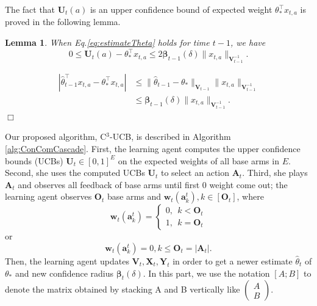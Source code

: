 \documentclass{article}
\newcommand{\bbeta}{\boldsymbol{\beta}}
\newcommand{\bA}{\mathbf{A}}
\newcommand{\ba}{\mathbf{a}}
\newcommand{\bO}{\mathbf{O}}
\newcommand{\bU}{\mathbf{U}}
\newcommand{\bV}{\mathbf{V}}
\newcommand{\bw}{\mathbf{w}}
\newcommand{\bX}{\mathbf{X}}
\newcommand{\bY}{\mathbf{Y}}
\newcommand{\abs}[1]{\left| #1 \right|}
\newcommand{\norm}[1]{\| #1 \|}
\newtheorem{lemma}[theorem]{Lemma}%
\newenvironment{proof}{\noindent {\textbf{Proof. }}}{$\Box$ \medskip}
\begin{document}
The fact that $\bU_t(a)$ is an upper confidence bound of expected weight $\theta_*^{\top}x_{t,a}$ is proved in the following lemma.
\begin{lemma} %
  \label{lem:estimateU}
  When Eq.\eqref{eq:estimateTheta} holds for time $t-1$, we have
  $$
    0 \leq \bU_t(a) - \theta_{\ast}^{\top}x_{t,a} \leq 2\bbeta_{t-1}(\delta)\norm{x_{t,a}}_{\bV_{t-1}^{-1}}.
  $$
\end{lemma}
\begin{proof}
  \begin{align*}
    \abs{\hat{\theta}_{t-1}^{\top}x_{t,a} - \theta_{\ast}^{\top}x_{t,a}} &\leq \norm{\hat{\theta}_{t-1} - \theta_{\ast}}_{\bV_{t-1}} \norm{x_{t,a}}_{\bV_{t-1}^{-1}} \\
    &\leq \bbeta_{t-1}(\delta)\norm{x_{t,a}}_{\bV_{t-1}^{-1}}.
  \end{align*}
\end{proof}

Our proposed algorithm, C$^3$-UCB, is described in Algorithm \ref{alg:ConComCascade}. 
First, the learning agent computes the upper confidence bounds (UCBs) $\bU_t \in [0,1]^{E}$ on the expected weights of all base arms in $E$. 
Second, she uses the computed UCBs $\bU_t$ to select an action $\bA_t$. 
Third, she plays $\bA_t$ and observes all feedback of base arms until first $0$ weight come out; the learning agent observes $\bO_t$ base arms and $\bw_t(\ba_k^t), k \in [\bO_t]$, where 
$$
  \bw_t(\ba_{k}^t) = \begin{cases} 0, ~~k < \bO_t\\ 1, ~~k = \bO_t\end{cases}
$$ 
or
$$
  \bw_t(\ba_k^t) = 0, k \leq \bO_t = \abs{\bA_t}.
$$
Then, the learning agent updates $\bV_t, \bX_t, \bY_t$ in order to get a newer estimate $\hat{\theta}_t$ of $\theta_*$ and new confidence radius $\bbeta_t(\delta)$. 
In this part, we use the notation $[A; B]$ to denote the matrix obtained by stacking A and B vertically like $\begin{pmatrix} A\\ B\end{pmatrix}$.
\end{document}
